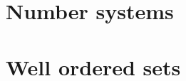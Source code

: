\documentclass{article}
\begin{document}
\begin{multicols}{2}
    
    
    
    \noindent\section{Number systems}
    
    
    
    
    
    \noindent\section{Well ordered sets}
    
    
    
    
  \end{multicols}
\end{document}
